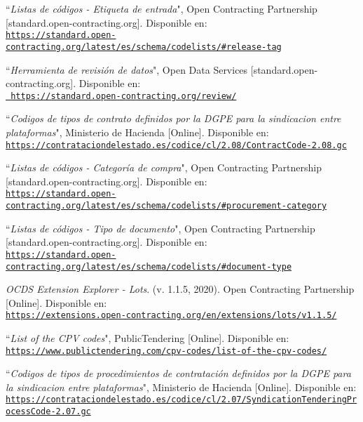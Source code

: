 \begin{thebibliography}{X}
           ``\textit{Listas de códigos - Etiqueta de entrada}", Open Contracting Partnership [standard.open-contracting.org]. Disponible en:
            \\ \texttt{\url{https://standard.open-contracting.org/latest/es/schema/codelists/\#release-tag}}
            
            ``\textit{Herramienta de revisión de datos}", Open Data Services  [standard.open-contracting.org]. Disponible en:  
            \\ \texttt{\url{ https://standard.open-contracting.org/review/}}
            
            ``\textit{Codigos de tipos de contrato definidos por la DGPE para la sindicacion entre plataformas}", Ministerio de Hacienda [Online]. Disponible en:
            \\ \texttt{\url{https://contrataciondelestado.es/codice/cl/2.08/ContractCode-2.08.gc}}
            
           ``\textit{Listas de códigos - Categoría de compra}", Open Contracting Partnership [standard.open-contracting.org]. Disponible en:
            \\ \texttt{\url{https://standard.open-contracting.org/latest/es/schema/codelists/\#procurement-category}}
            
            ``\textit{Listas de códigos - Tipo de documento}", Open Contracting Partnership [standard.open-contracting.org]. Disponible en:
            \\ \texttt{\url{https://standard.open-contracting.org/latest/es/schema/codelists/\#document-type}}
            
           \textit{OCDS Extension Explorer - Lots}. (v. 1.1.5, 2020). Open Contracting Partnership [Online]. Disponible en:   
            \\ \texttt{\url{https://extensions.open-contracting.org/en/extensions/lots/v1.1.5/}}
            
            ``\textit{List of the CPV codes}", PublicTendering [Online]. Disponible en:   
            \\ \texttt{\url{https://www.publictendering.com/cpv-codes/list-of-the-cpv-codes/}}
            
            ``\textit{Codigos de tipos de procedimientos de contratación definidos por la DGPE para la sindicacion entre plataformas}", Ministerio de Hacienda [Online]. Disponible en:
            \\ \texttt{\url{https://contrataciondelestado.es/codice/cl/2.07/SyndicationTenderingProcessCode-2.07.gc}}
            

\end{thebibliography}
